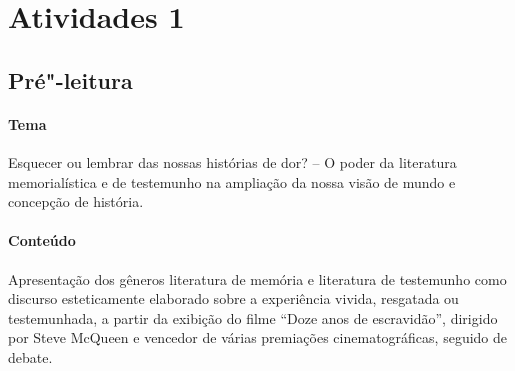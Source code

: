 \documentclass[11pt]{extarticle}
\begin{document}
\begin{abstract}
Para interpretar esta obra de literatura brasileira contemporânea,
buscamos mobilizar uma série de conhecimentos, sociológicos,
antropológicos, históricos e geográficos, que transcendem o texto e nos
pintam um verdadeiro painel deste complicado Brasil de princípios do
século \textsc{xxi} - sobretudo, das camadas mais marginalizadas da nossa
juventude. Guiou"-nos a busca do ``aprimoramento do educando como pessoa
humana, incluindo a formação ética e o desenvolvimento da autonomia
intelectual e do pensamento crítico'', como preconiza o Artigo nº 35 da
LDB 9394/96. Esperamos ser bem"-sucedidos neste intento, de modo a
suscitar entre os nossos jovens o gosto pela leitura e por valores
humanos tão caros como o respeito aos diferentes, o apreço pela justiça,
a solidariedade e a efetivação de uma liberdade que seja capaz de
conjugar os interesses coletivos e individuais.

\end{abstract}

\tableofcontents


\section{Atividades 1}



\subsection{Pré"-leitura}

\paragraph{Tema} Esquecer ou lembrar das nossas histórias de dor? -- O
poder da literatura memorialística e de testemunho na ampliação da nossa
visão de mundo e concepção de história.

\paragraph{Conteúdo} Apresentação dos gêneros literatura de memória e
literatura de testemunho como discurso esteticamente elaborado sobre a
experiência vivida, resgatada ou testemunhada, a partir da exibição do
filme ``Doze anos de escravidão'', dirigido por Steve McQueen e vencedor
de várias premiações cinematográficas, seguido de debate.
\end{document}
